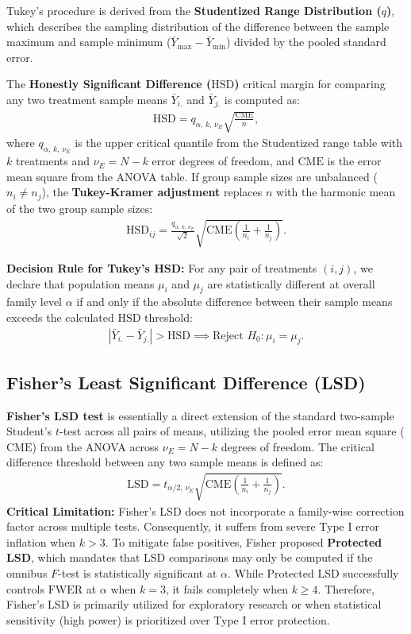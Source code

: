 Tukey's procedure is derived from the \textbf{Studentized Range Distribution ($q$)}, which describes the sampling distribution of the difference between the sample maximum and sample minimum ($\bar{Y}_{\text{max}} - \bar{Y}_{\text{min}}$) divided by the pooled standard error.

The \textbf{Honestly Significant Difference ($\text{HSD}$)} critical margin for comparing any two treatment sample means $\bar{Y}_{i.}$ and $\bar{Y}_{j.}$ is computed as:
\begin{align}
	\text{HSD} = q_{\alpha, \, k, \, \nu_E} \sqrt{\frac{\text{CME}}{n}},
	\label{eq:tukey_hsd}
\end{align}
where $q_{\alpha, \, k, \, \nu_E}$ is the upper critical quantile from the Studentized range table with $k$ treatments and $\nu_E = N - k$ error degrees of freedom, and $\text{CME}$ is the error mean square from the ANOVA table. If group sample sizes are unbalanced ($n_i \neq n_j$), the \textbf{Tukey-Kramer adjustment} replaces $n$ with the harmonic mean of the two group sample sizes:
\begin{align}
	\text{HSD}_{ij} = \frac{q_{\alpha, \, k, \, \nu_E}}{\sqrt{2}} \sqrt{\text{CME} \left( \frac{1}{n_i} + \frac{1}{n_j} \right)}.
\end{align}

\textbf{Decision Rule for Tukey's HSD:} For any pair of treatments $(i, j)$, we declare that population means $\mu_i$ and $\mu_j$ are statistically different at overall family level $\alpha$ if and only if the absolute difference between their sample means exceeds the calculated $\text{HSD}$ threshold:
\begin{align}
	|\bar{Y}_{i.} - \bar{Y}_{j.}| > \text{HSD} \implies \text{Reject } H_0: \mu_i = \mu_j.
\end{align}

\subsection*{Fisher's Least Significant Difference (LSD)}
\textbf{Fisher's LSD test} is essentially a direct extension of the standard two-sample Student's $t$-test across all pairs of means, utilizing the pooled error mean square ($\text{CME}$) from the ANOVA across $\nu_E = N - k$ degrees of freedom. The critical difference threshold between any two sample means is defined as:
\begin{align}
	\text{LSD} = t_{\alpha/2, \, \nu_E} \sqrt{\text{CME} \left( \frac{1}{n_i} + \frac{1}{n_j} \right)}.
\end{align}
\textbf{Critical Limitation:} Fisher's LSD does not incorporate a family-wise correction factor across multiple tests. Consequently, it suffers from severe Type I error inflation when $k > 3$. To mitigate false positives, Fisher proposed \textbf{Protected LSD}, which mandates that LSD comparisons may only be computed if the omnibus $F$-test is statistically significant at $\alpha$. While Protected LSD successfully controls $\text{FWER}$ at $\alpha$ when $k=3$, it fails completely when $k \geq 4$. Therefore, Fisher's LSD is primarily utilized for exploratory research or when statistical sensitivity (high power) is prioritized over Type I error protection.

